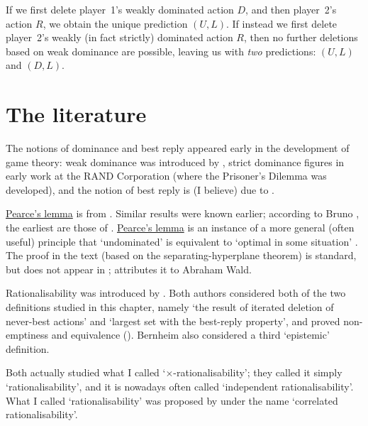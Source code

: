 \addtocounter{example}{-2}
\begin{example}[continued]
	\label{example:idwds_iterated}
	If we first delete player~1's weakly dominated action $D$, and then player~2's action $R$, we obtain the unique prediction $(U,L)$. If instead we first delete player~2's weakly (in fact strictly) dominated action $R$, then no further deletions based on weak dominance are possible, leaving us with \emph{two} predictions: $(U,L)$ and $(D,L)$.
\end{example}
\addtocounter{example}{1}



\section{The literature}
\label{dom:lit}

The notions of dominance and best reply appeared early in the development of game theory: weak dominance was introduced by \textcite{Borel1921}, strict dominance figures in early work at the RAND Corporation (where the Prisoner's Dilemma was developed), and the notion of best reply is (I believe) due to \textcite{Nash1950,Nash1951}.

\hyperref[lemma:pearce]{Pearce's lemma} is from \textcite[][Lemma~3]{Pearce1984}. Similar results were known earlier; according to Bruno \textcite{Salcedo2020}, the earliest are those of \textcite{Wald1939,Stein1955}. \hyperref[lemma:pearce]{Pearce's lemma} is an instance of a more general (often useful) principle that `undominated' is equivalent to `optimal in some situation' \parencite[see e.g.][]{BorgersCheng2023}. The proof in the text (based on the separating-hyperplane theorem) is standard, but does not appear in \textcite{Pearce1984}; \textcite{Salcedo2020} attributes it to Abraham Wald.

Rationalisability was introduced by \textcite{Bernheim1984,Pearce1984}. Both authors considered both of the two definitions studied in this chapter, namely `the result of iterated deletion of never-best actions' and `largest set with the best-reply property', and proved non-emptiness and equivalence (). Bernheim also considered a third `epistemic' definition.

Both \textcite{Bernheim1984,Pearce1984} actually studied what I called `$\times$-rationalisability'; they called it simply `rationalisability', and it is nowadays often called `independent rationalisability'. What I called `rationalisability' was proposed by \textcite{BrandenburgerDekel1987} under the name `correlated rationalisability'.

